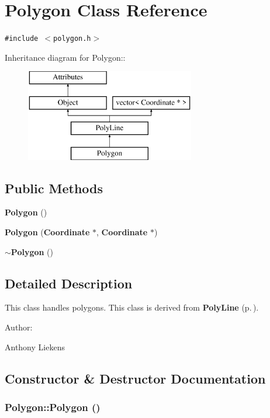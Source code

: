 \section{Polygon Class Reference}
\label{classPolygon}
{\tt \#include $<$polygon.h$>$}

Inheritance diagram for Polygon::\begin{figure}[H]
\begin{center}
\leavevmode
\includegraphics[height=4cm]{classPolygon}
\end{center}
\end{figure}
\subsection*{Public Methods}
\begin{CompactItemize}
\item 
{\bf Polygon} ()
\item 
{\bf Polygon} ({\bf Coordinate} $\ast$, {\bf Coordinate} $\ast$)
\item 
{\bf $\sim$Polygon} ()
\end{CompactItemize}


\subsection{Detailed Description}
This class handles polygons. This class is derived from {\bf Poly\-Line} {\rm (p.\,\pageref{classPolyLine})}. \begin{Desc}
\item[Author: ]\par
Anthony Liekens \end{Desc}




\subsection{Constructor \& Destructor Documentation}
\subsubsection{\setlength{\rightskip}{0pt plus 5cm}Polygon::Polygon ()}\label{classPolygon_a0}


